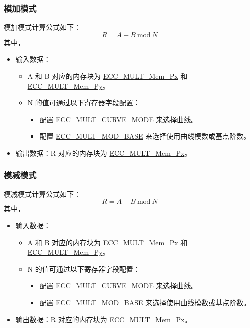 \documentclass[main\_\_CN.tex]{subfiles}
\begin{document}
\subsubsection{模加模式}
模加模式计算公式如下：
\[
R = A + B \ \textrm{mod}\ N
\]
其中，
\begin{itemize}
    \item 输入数据：
    \begin{itemize}
        \item A 和 B 对应的内存块为 \hyperref[tab:ecc-memory]{ECC\_MULT\_Mem\_Px} 和 \hyperref[tab:ecc-memory]{ECC\_MULT\_Mem\_Py}。
        \item N 的值可通过以下寄存器字段配置：
        \begin{itemize}
            \item 配置 \hyperref[fielddesc:ECCMULTCURVEMODE]{ECC\_MULT\_CURVE\_MODE} 来选择曲线。
            \item 配置 \hyperref[fielddesc:ECCMULTMODBASE]{ECC\_MULT\_MOD\_BASE} 来选择使用曲线模数或基点阶数。
        \end{itemize}
    \end{itemize}
    \item 输出数据：R 对应的内存块为 \hyperref[tab:ecc-memory]{ECC\_MULT\_Mem\_Px}。
\end{itemize}

\subsubsection{模减模式}
模减模式计算公式如下：
\[
R = A - B \ \textrm{mod}\ N
\]
其中，
\begin{itemize}
    \item 输入数据：
    \begin{itemize}
        \item A 和 B 对应的内存块为 \hyperref[tab:ecc-memory]{ECC\_MULT\_Mem\_Px} 和 \hyperref[tab:ecc-memory]{ECC\_MULT\_Mem\_Py}。
        \item N 的值可通过以下寄存器字段配置：
        \begin{itemize}
            \item 配置 \hyperref[fielddesc:ECCMULTCURVEMODE]{ECC\_MULT\_CURVE\_MODE} 来选择曲线。
            \item 配置 \hyperref[fielddesc:ECCMULTMODBASE]{ECC\_MULT\_MOD\_BASE} 来选择使用曲线模数或基点阶数。
        \end{itemize}
    \end{itemize}
    \item 输出数据：R 对应的内存块为 \hyperref[tab:ecc-memory]{ECC\_MULT\_Mem\_Px}。
\end{itemize}
\end{document}
